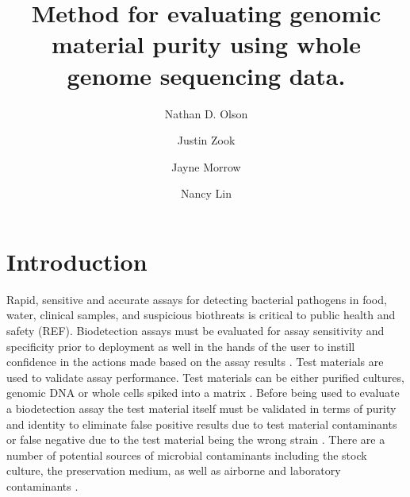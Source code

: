 \documentclass[fleqn,10pt,lineno]{wlpeerj}\usepackage[]{graphicx}\usepackage[]{color}
\title{Method for evaluating genomic material purity using whole genome sequencing data.}
\author[1]{Nathan D. Olson}
\author[1]{Justin Zook}
\author[1]{Jayne Morrow}
\author[1]{Nancy Lin}
\affil[1]{Biosystems and Biomaterials Division, National Institute of Standards and Technology}
\begin{document}
\flushbottom
\maketitle
\thispagestyle{empty}

\section*{Introduction}
Rapid, sensitive and accurate assays for detecting bacterial pathogens in food, water, clinical samples, and  suspicious biothreats is critical to public health and safety (REF). 
Biodetection assays must be evaluated for assay sensitivity and specificity prior to deployment as well in the hands of the user to instill confidence in the actions made based on the assay results \citep{Ieven2013,International2011,EPA2004,ISO/TS2010,Guide1998,Feldsine2002}. 
Test materials are used to validate assay performance.  Test materials can be either purified cultures, genomic DNA or whole cells spiked into a matrix \citep{EPA2004,ISO/TS2010,CLSI2010}. 
Before being used to evaluate a biodetection assay the test material itself must be validated in terms of purity and identity to eliminate false positive results due to test material contaminants or false negative due to the test material being the wrong strain \citep{CLSI2010}. 
There are a number of potential sources of microbial contaminants  including the stock culture, the preservation medium, as well as airborne and laboratory contaminants \citep{Marron2013,Shrestha2013,Tanner1998}.   
 
\end{document}
